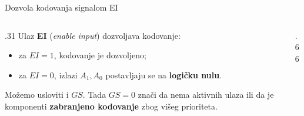 \begin{frame}[t,label=03-s020]{Dozvola kodovanja signalom EI}
\setlength{\parskip}{0pt}
\begin{columns}[c,onlytextwidth]
\begin{column}{.31\textwidth}
Ulaz \textcolor{DEisticanje}{\textbf{EI}} (\emph{enable input})
dozvoljava kodovanje:
\begin{itemize}
\item za \(EI=1\), kodovanje je dozvoljeno;
\item za \(EI=0\), izlazi \(A_1,A_0\) postavljaju se na \textbf{logičku nulu}.
\end{itemize}
\par\vspace{1.5mm}
Možemo usloviti i \(GS\). Tada \(GS=0\) znači da nema aktivnih ulaza
ili da je komponenti \textbf{zabranjeno kodovanje} zbog višeg prioriteta.
\end{column}
\begin{column}{.66\textwidth}\centering
\begingroup
\def\DEenable{1}\def\DEjedinica{.75cm}\def\DEvisinaPrioriteta{.70cm}\def\DEgejt{.55}

\endgroup
\end{column}
\end{columns}
\end{frame}
